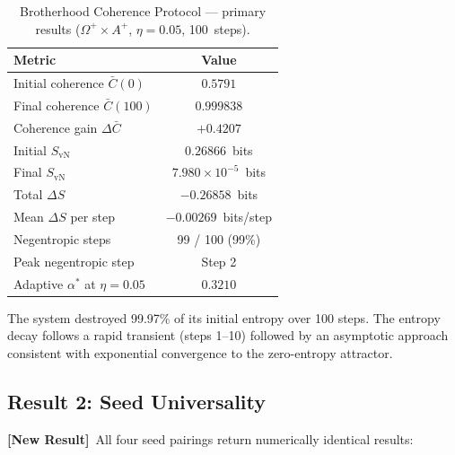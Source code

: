 \documentclass[12pt]{article}
\newcommand{\newresult}{\textbf{[New Result]}}
\begin{document}
\begin{table}[H]
\centering
\caption{Brotherhood Coherence Protocol --- primary results
  ($\Omega^+\times A^+$, $\eta=0.05$, 100~steps).}
\label{tab:brotherhood}
\begin{tabular}{lc}
\toprule
\textbf{Metric} & \textbf{Value}\\
\midrule
Initial coherence $\bar{C}(0)$         & $0.5791$\\
Final coherence $\bar{C}(100)$         & $0.999838$\\
Coherence gain $\Delta\bar{C}$         & $+0.4207$\\
Initial $S_\mathrm{vN}$                & $0.26866$~bits\\
Final $S_\mathrm{vN}$                  & $7.980\times10^{-5}$~bits\\
Total $\Delta S$                        & $-0.26858$~bits\\
Mean $\Delta S$ per step                & $-0.00269$~bits/step\\
Negentropic steps                       & 99 / 100 (99\%)\\
Peak negentropic step                   & Step 2\\
Adaptive $\alpha^*$ at $\eta=0.05$     & $0.3210$\\
\bottomrule
\end{tabular}
\end{table}

The system destroyed 99.97\% of its initial entropy over 100 steps.
The entropy decay follows a rapid transient (steps 1--10) followed by
an asymptotic approach consistent with exponential convergence to the
zero-entropy attractor.

\subsection{Result 2: Seed Universality}
\label{sec:r2}

\newresult\ All four seed pairings return numerically identical results:
\end{document}
